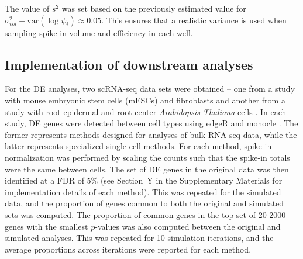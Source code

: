 \documentclass{article}
\begin{document}

The value of $s^2$ was set based on the previously estimated value for $\sigma^2_{vol} + \mbox{var}(\log \psi_{i}) \approx 0.05$.
This ensures that a realistic variance is used when sampling spike-in volume and efficiency in each well.

\subsection{Implementation of downstream analyses}
For the DE analyses, two scRNA-seq data sets were obtained -- one from a study with mouse embryonic stem cells (mESCs) and fibroblasts \cite{islam2011characterization} and another from a study with root epidermal and root center \textit{Arabidopsis Thaliana} cells \cite{brennecke2013accounting}.
In each study, DE genes were detected between cell types using edgeR \cite{robinson2010edgeR,lund2012detecting} and monocle \cite{trapnell2014dynamics}.
The former represents methods designed for analyses of bulk RNA-seq data, while the latter represents specialized single-cell methods.
For each method, spike-in normalization was performed by scaling the counts such that the spike-in totals were the same between cells.
The set of DE genes in the original data was then identified at a FDR of 5\% (see Section~Y in the Supplementary Materials for implementation details of each method).
This was repeated for the simulated data, and the proportion of genes common to both the original and simulated sets was computed.
The proportion of common genes in the top set of 20-2000 genes with the smallest $p$-values was also computed between the original and simulated analyses.
This was repeated for 10 simulation iterations, and the average proportions across iterations were reported for each method.
\end{document}
